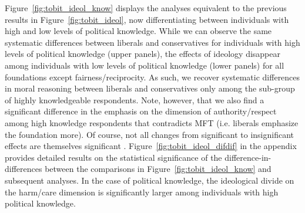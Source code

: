 \documentclass[12pt]{article}
\begin{document}
Figure~\ref{fig:tobit_ideol_know} displays the analyses equivalent to the previous results in Figure~\ref{fig:tobit_ideol}, now differentiating between individuals with high and low levels of political knowledge. While we can observe the same systematic differences between liberals and conservatives for individuals with high levels of political knowledge (upper panels), the effects of ideology disappear among individuals with low levels of political knowledge (lower panels) for all foundations except fairness/reciprocity. As such, we recover systematic differences in moral reasoning between liberals and conservatives only among the sub-group of highly knowledgeable respondents. Note, however, that we also find a significant difference in the emphasis on the dimension of authority/respect among high knowledge respondents that contradicts MFT (i.e. liberals emphasize the foundation more). Of course, not all changes from significant to insignificant effects are themselves significant \citep[c.f.,][]{gelman2006difference}. Figure~\ref{fig:tobit_ideol_difdif} in the appendix provides detailed results on the statistical significance of the difference-in-differences between the comparisons in Figure~\ref{fig:tobit_ideol_know} and subsequent analyses. In the case of political knowledge, the ideological divide on the harm/care dimension is significantly larger among individuals with high political knowledge.
\end{document}
